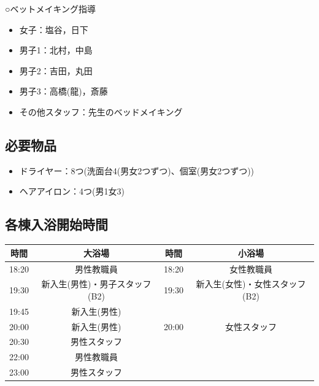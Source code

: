 ○ベットメイキング指導
\begin{itemize}
\item 女子：塩谷，日下
\item 男子1：北村，中島
\item 男子2：吉田，丸田
\item 男子3：高橋(龍)，斎藤
\item その他スタッフ：先生のベッドメイキング
\end{itemize}
\subsection{必要物品}
\begin{itemize}
\item ドライヤー：8つ(洗面台4(男女2つずつ)、個室(男女2つずつ))
\item ヘアアイロン：4つ(男1女3)
\end{itemize}

\subsection{各棟入浴開始時間}
\label{sec:bath}
\begin{table}[H]
\begin{center}
\begin{tabular}{|c|c|c|c|}
\hline
 {時間}&{大浴場}&{時間}&{小浴場} \\ \hline
 18:20 & 男性教職員 & 18:20 & 女性教職員 \\ \hline
 19:30 & 新入生(男性)・男子スタッフ(B2) & 19:30 & 新入生(女性)・女性スタッフ(B2) \\ \hline
 19:45 & 新入生(男性) & & \\ \hline
 20:00 & 新入生(男性) & 20:00 & 女性スタッフ\\ \hline
 20:30 & 男性スタッフ & & \\ \hline
 22:00 & 男性教職員 & & \\ \hline
 23:00 & 男性スタッフ & & \\ \hline
\end{tabular}
\end{center}
\end{table}

